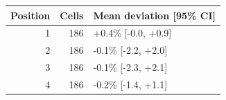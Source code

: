 \begin{tabular}{rrl}
\toprule
Position & Cells & Mean deviation [95\% CI] \\
\midrule
1 & 186 & +0.4\% [-0.0, +0.9] \\
2 & 186 & -0.1\% [-2.2, +2.0] \\
3 & 186 & -0.1\% [-2.3, +2.1] \\
4 & 186 & -0.2\% [-1.4, +1.1] \\
\bottomrule
\end{tabular}
